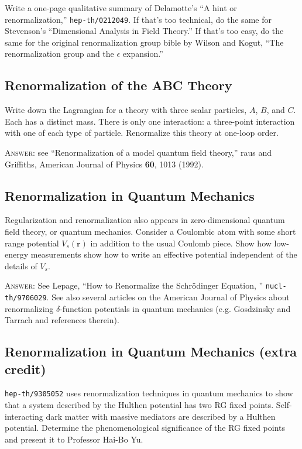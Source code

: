 \documentclass[12pt]{article}
\numberwithin{equation}{subsection}    %
\renewcommand{\vec}[1]{\mathbf{#1}} %
\begin{document}
Write a one-page qualitative summary of Delamotte's ``A hint or renormalization,'' \texttt{hep-th/0212049}. If that's too technical, do the same for Stevenson's ``Dimensional Analysis in Field Theory.''  If that's too easy, do the same for the original renormalization group bible by Wilson and Kogut, ``The renormalization group and the $\epsilon$ expansion.''


\subsection{Renormalization of the ABC Theory}

Write down the Lagrangian for a theory with three scalar particles, $A$, $B$, and $C$. Each has a distinct mass. There is only one interaction: a three-point interaction with one of each type of particle. Renormalize this theory at one-loop order. 

\textsc{Answer}: see ``Renormalization of a model quantum field theory,'' raus and Griffiths, American Journal of Physics \textbf{60}, 1013 (1992).

\subsection{Renormalization in Quantum Mechanics}

Regularization and renormalization also appears in zero-dimensional quantum field theory, or quantum mechanics. Consider a Coulombic atom with some short range potential $V_s(\vec{r})$ in addition to the usual Coulomb piece. Show how low-energy measurements show how to write an effective potential independent of the details of $V_s$. 

\textsc{Answer}: See Lepage, ``How to Renormalize the Schr\"odinger Equation, '' \texttt{nucl-th/9706029}. See also several articles on the American Journal of Physics about renormalizing $\delta$-function potentials in quantum mechanics (e.g. Gosdzinsky and Tarrach and references therein).

\subsection{Renormalization in Quantum Mechanics (extra credit)}

\texttt{hep-th/9305052} uses renormalization techniques in quantum mechanics to show that a system described by the Hulthen potential has two RG fixed points. Self-interacting dark matter with massive mediators are described by a Hulthen potential. Determine the phenomenological significance of the RG fixed points and present it to Professor Hai-Bo Yu.
\end{document}
